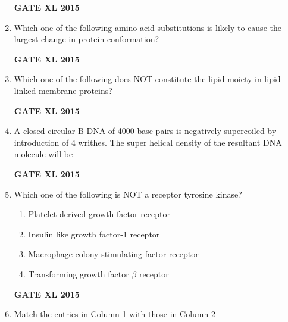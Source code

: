 \documentclass[journal,12pt,onecolumn]{IEEEtran}
\begin{document}
\begin{enumerate}
\begin{enumerate}
    \end{enumerate}
\begin{flushright}\textbf{GATE XL 2015}\end{flushright}
\item Which one of the following amino acid substitutions is likely to cause the largest change in protein conformation?
    \begin{enumerate}
    \end{enumerate}
\begin{flushright}\textbf{GATE XL 2015}\end{flushright}
\item Which one of the following does NOT constitute the lipid moiety in lipid-linked membrane proteins?
        \begin{enumerate} 
	\end{enumerate}
\begin{flushright}\textbf{GATE XL 2015}\end{flushright}
\item A closed circular B-DNA of 4000 base pairs is negatively supercoiled by introduction of 4 writhes. The super helical density of the resultant DNA molecule will be
\begin{flushright}\textbf{GATE XL 2015}\end{flushright}
\item Which one of the following is NOT a receptor tyrosine kinase?
    \begin{enumerate}
            \item Platelet derived growth factor receptor
	    \item Insulin like growth factor-1 receptor
	    \item Macrophage colony stimulating factor receptor
            \item Transforming growth factor $\beta$ receptor
    \end{enumerate}
\begin{flushright}\textbf{GATE XL 2015}\end{flushright}
\item Match the entries in Column-1 with those in Column-2



\end{enumerate}
\end{document}
